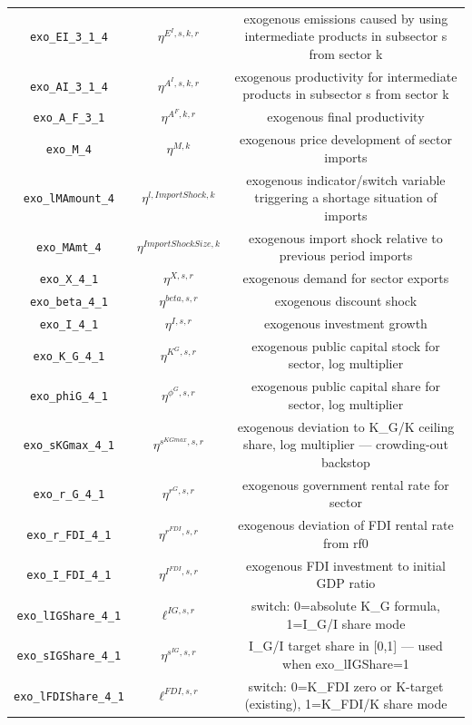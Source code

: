 \begin{center}
\begin{longtable}{ccc}
\texttt{exo\_EI\_3\_1\_4} & ${\eta^{E^{I},s,k,r}}$ & exogenous emissions caused by using intermediate products in subsector s from sector k\\
\texttt{exo\_AI\_3\_1\_4} & ${\eta^{A^{I},s,k,r}}$ & exogenous productivity for intermediate products in subsector s from sector k\\
\texttt{exo\_A\_F\_3\_1} & ${\eta^{A^F,k,r}}$ & exogenous final productivity\\
\texttt{exo\_M\_4} & ${\eta^{M,k}}$ & exogenous price development of sector imports\\
\texttt{exo\_lMAmount\_4} & ${\eta^{l,Import Shock,k}}$ & exogenous indicator/switch variable triggering a shortage situation of imports\\
\texttt{exo\_MAmt\_4} & ${\eta^{Import Shock Size,k}}$ & exogenous import shock relative to previous period imports\\
\texttt{exo\_X\_4\_1} & ${\eta^{X,s,r}}$ & exogenous demand for sector exports\\
\texttt{exo\_beta\_4\_1} & ${\eta^{beta,s,r}}$ & exogenous discount shock\\
\texttt{exo\_I\_4\_1} & ${\eta^{I,s,r}}$ & exogenous investment growth\\
\texttt{exo\_K\_G\_4\_1} & ${\eta^{K^G,s,r}}$ & exogenous public capital stock for sector, log multiplier\\
\texttt{exo\_phiG\_4\_1} & ${\eta^{\phi^{G},s,r}}$ & exogenous public capital share for sector, log multiplier\\
\texttt{exo\_sKGmax\_4\_1} & ${\eta^{s^{KGmax},s,r}}$ & exogenous deviation to K\_G/K ceiling share, log multiplier — crowding-out backstop\\
\texttt{exo\_r\_G\_4\_1} & ${\eta^{r^G,s,r}}$ & exogenous government rental rate for sector\\
\texttt{exo\_r\_FDI\_4\_1} & ${\eta^{r^{FDI},s,r}}$ & exogenous deviation of FDI rental rate from rf0\\
\texttt{exo\_I\_FDI\_4\_1} & ${\eta^{I^{FDI},s,r}}$ & exogenous FDI investment to initial GDP ratio\\
\texttt{exo\_lIGShare\_4\_1} & ${\ell^{IG,s,r}}$ & switch: 0=absolute K\_G formula, 1=I\_G/I share mode\\
\texttt{exo\_sIGShare\_4\_1} & ${\eta^{s^{IG},s,r}}$ & I\_G/I target share in [0,1] — used when exo\_lIGShare=1\\
\texttt{exo\_lFDIShare\_4\_1} & ${\ell^{FDI,s,r}}$ & switch: 0=K\_FDI zero or K-target (existing), 1=K\_FDI/K share mode\\

\end{longtable}
\end{center}
